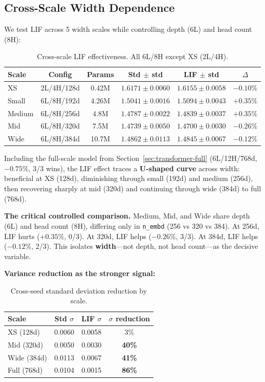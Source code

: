 \documentclass[11pt]{article}
\begin{document}
\subsection{Cross-Scale Width Dependence}
\label{sec:width}

We test LIF across 5 width scales while controlling depth (6L) and head count (8H):

\begin{table}[h]
\centering
\caption{Cross-scale LIF effectiveness. All 6L/8H except XS (2L/4H).}
\label{tab:cross-scale}
\begin{tabular}{lccccc}
\toprule
\textbf{Scale} & \textbf{Config} & \textbf{Params} & \textbf{Std $\pm$ std} & \textbf{LIF $\pm$ std} & \textbf{$\Delta$} \\
\midrule
XS & 2L/4H/128d & 0.42M & $1.6171 \pm 0.0060$ & $1.6155 \pm 0.0058$ & $-0.10\%$ \\
Small & 6L/8H/192d & 4.26M & $1.5041 \pm 0.0016$ & $1.5094 \pm 0.0043$ & $+0.35\%$ \\
Medium & 6L/8H/256d & 4.8M & $1.4787 \pm 0.0022$ & $1.4839 \pm 0.0037$ & $+0.35\%$ \\
Mid & 6L/8H/320d & 7.5M & $1.4739 \pm 0.0050$ & $1.4700 \pm 0.0030$ & $\mathbf{-0.26\%}$ \\
Wide & 6L/8H/384d & 10.7M & $1.4862 \pm 0.0113$ & $1.4845 \pm 0.0067$ & $-0.12\%$ \\
\bottomrule
\end{tabular}
\end{table}

Including the full-scale model from Section~\ref{sec:transformer-full} (6L/12H/768d, $-0.75\%$, 3/3 wins), the LIF effect traces a \textbf{U-shaped curve} across width: beneficial at XS (128d), diminishing through small (192d) and medium (256d), then recovering sharply at mid (320d) and continuing through wide (384d) to full (768d).

\textbf{The critical controlled comparison.} Medium, Mid, and Wide share depth (6L) and head count (8H), differing only in \texttt{n\_embd} (256 vs 320 vs 384). At 256d, LIF hurts ($+0.35\%$, 0/3). At 320d, LIF helps ($-0.26\%$, 3/3). At 384d, LIF helps ($-0.12\%$, 2/3). This isolates \textbf{width}---not depth, not head count---as the decisive variable.

\textbf{Variance reduction as the stronger signal:}

\begin{table}[h]
\centering
\caption{Cross-seed standard deviation reduction by scale.}
\label{tab:variance}
\begin{tabular}{lccc}
\toprule
\textbf{Scale} & \textbf{Std $\sigma$} & \textbf{LIF $\sigma$} & \textbf{$\sigma$ reduction} \\
\midrule
XS (128d) & 0.0060 & 0.0058 & 3\% \\
Mid (320d) & 0.0050 & 0.0030 & \textbf{40\%} \\
Wide (384d) & 0.0113 & 0.0067 & \textbf{41\%} \\
Full (768d) & 0.0104 & 0.0015 & \textbf{86\%} \\
\bottomrule
\end{tabular}
\end{table}
\end{document}
